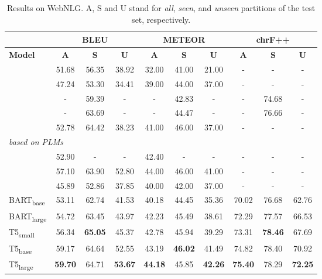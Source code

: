 \documentclass[11pt]{article}
\begin{document}
\begin{table*}[t]
\small
\centering
{\renewcommand{\arraystretch}{0.9}
\begin{tabular}{@{\hspace*{1mm}}l@{\hspace*{3mm}}ccccccccc@{\hspace*{1mm}}}  
\toprule
& \multicolumn{3}{c}{\textbf{BLEU}} & \multicolumn{3}{c}{\textbf{METEOR}} & \multicolumn{3}{c}{\textbf{chrF++}} \\
\midrule
\textbf{Model} & \textbf{A} & \textbf{S} & \textbf{U} & \textbf{A} & \textbf{S} & \textbf{U} & \textbf{A} & \textbf{S} & \textbf{U} \\
\midrule
\citet{castro-ferreira-etal-2019-neural} & 51.68 & 56.35 & 38.92 & 32.00 & 41.00 &21.00  & - & - & - \\
\citet{moryossef-etal-2019-step} & 47.24 & 53.30 & 34.41 & 39.00 & 44.00 & 37.00 & - & - & - \\
\citet{schmitt2020modeling} & - & 59.39 & - & - & 42.83 & - & - & 74.68 & - \\
\citet{ribeiro-etal-2020-modeling} & - & 63.69 & - & - & 44.47 & - & - & 76.66 & - \\
\citet{zhao-etal-2020-bridging} & 52.78 & 64.42 & 38.23 & 41.00 & 46.00 & 37.00 & - & - & - \\
\midrule
\multicolumn{2}{l}{\small{\textit{based on PLMs}}} & & \\[.2em]
\citet{harkous2020text} & 52.90 & - & - & 42.40 & - & - & - & - & - \\
\citet{kale2020texttotext} & 57.10 & 63.90 & 52.80 & 44.00 & 46.00 & 41.00 & - & - & -\\
\citet{radev2020dart} & 45.89 & 52.86 & 37.85 & 40.00 & 42.00 & 37.00 & - & - & -\\
\midrule
BART\textsubscript{base} & 53.11 & 62.74 & 41.53 & 40.18 & 44.45 & 35.36 & 70.02 & 76.68 & 62.76 \\
BART\textsubscript{large} & 54.72 & 63.45 & 43.97 & 42.23 & 45.49 & 38.61 & 72.29 & 77.57 & 66.53 \\
T5\textsubscript{small} & 56.34 & \textbf{65.05} & 45.37 & 42.78 & 45.94 & 39.29 & 73.31 & \textbf{78.46} & 67.69 \\
T5\textsubscript{base} & 59.17 & 64.64 & 52.55 & 43.19 & \textbf{46.02} & 41.49 & 74.82 & 78.40 & 70.92 \\
T5\textsubscript{large} & \textbf{59.70} & 64.71 & \textbf{53.67} & \textbf{44.18} & 45.85 & \textbf{42.26} & \textbf{75.40} & 78.29 & \textbf{72.25} \\


\bottomrule
\end{tabular}}
\caption{Results on WebNLG. A, S and U stand for \textit{all}, \textit{seen}, and \textit{unseen} partitions of the test set, respectively.}
\label{tab:results-webnlg}   
\end{table*}
\end{document}
